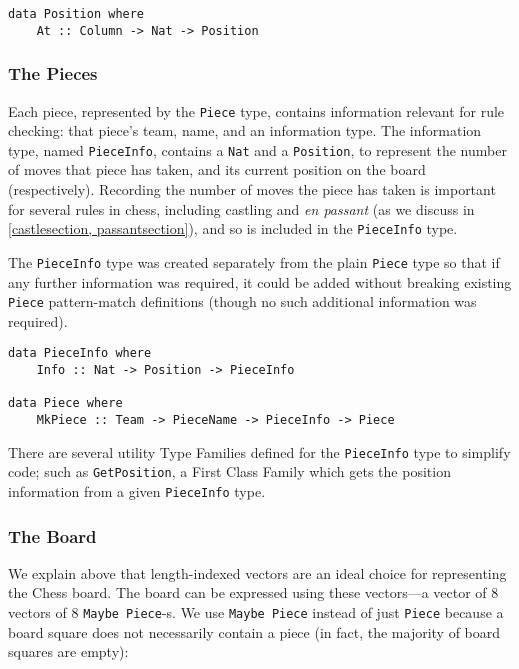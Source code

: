 \documentclass[12pt, a4paper, bibliography=totocnumbered]{scrreprt}
\newcommand{\inline}[1]{\lstinline[basicstyle=\ttfamily\footnotesize]{#1}}
\begin{document}
\begin{lstlisting}
data Position where
    At :: Column -> Nat -> Position
\end{lstlisting}

\subsubsection{The Pieces}

Each piece, represented by the \inline{Piece} type, contains information relevant for rule checking: that piece's team, name, and an information type. The information type, named \inline{PieceInfo}, contains a \inline{Nat} and a \inline{Position}, to represent the number of moves that piece has taken, and its current position on the board (respectively). Recording the number of moves the piece has taken is important for several rules in chess, including castling and \textit{en passant} (as we discuss in \cref{castlesection, passantsection}), and so is included in the \inline{PieceInfo} type.

The \inline{PieceInfo} type was created separately from the plain \inline{Piece} type so that if any further information was required, it could be added without breaking existing \inline{Piece} pattern-match definitions (though no such additional information was required).

\begin{lstlisting}
data PieceInfo where
    Info :: Nat -> Position -> PieceInfo

data Piece where
    MkPiece :: Team -> PieceName -> PieceInfo -> Piece
\end{lstlisting}

There are several utility Type Families defined for the \inline{PieceInfo} type to simplify code; such as \inline{GetPosition}, a First Class Family which gets the position information from a given \inline{PieceInfo} type.

\subsubsection{The Board}

We explain above that length-indexed vectors are an ideal choice for representing the Chess board. The board can be expressed using these vectors---a vector of 8 vectors of 8 \inline{Maybe Piece}-s. We use \inline{Maybe Piece} instead of just \inline{Piece} because a board square does not necessarily contain a piece (in fact, the majority of board squares are empty):
\end{document}
